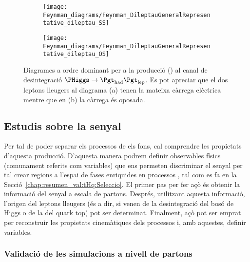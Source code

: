  
 
 \begin{figure}[htbp!]
  \centering  
  \begin{subfigure}[b]{0.45\textwidth}
    \centering
    \texttt{[image: Feynman\_diagrams/Feynman\_DileptauGeneralRepresentative\_dileptau\_SS]}
    \caption{\dilepSStau}
    \label{fig:tHq:Resum:diltauFeynmanDiagram:SS}
  \end{subfigure}
  \hfill
  \begin{subfigure}[b]{0.45\textwidth}
    \centering
    \texttt{[image: Feynman\_diagrams/Feynman\_DileptauGeneralRepresentative\_dileptau\_OS]}
    \caption{\dilepOStau}
    \label{fig:tHq:Resum:diltauFeynmanDiagram:OS}
  \end{subfigure}
  \caption{Diagrames a ordre dominant per a la producció \tHq (\dileptau) al canal de desintegració $\PHiggs \rightarrow \tauhad \taulep$.
Es pot apreciar que el dos leptons lleugers al diagrama (a) tenen la mateixa càrrega elèctrica mentre que en (b) la càrrega és oposada.}
  \label{fig:resum:ChaptH:dileptauFeynmanDiagram}
\end{figure}



\subsection{Estudis sobre la senyal}
\label{chap:resumen_val:tHq:Senyal}
Per tal de poder separar els processos \tHq de els fons, cal comprendre les propietats
d'aquesta producció. D'aquesta manera podrem definir observables físics (comunament referits com variables)
que ens permeten discriminar el senyal per tal crear regions a l'espai de fases enriquides en processos \tHq,
tal com es fa en la Secció~\ref{chap:resumen_val:tHq:Seleccio}. El primer pas per fer açò és obtenir la informació del senyal a escala de partons. Després, utilitzant aquesta informació, l'origen del leptons lleugers (és a dir, si venen
de la desintegració del bosó de Higgs o de la del quark top) pot ser determinat. Finalment, açò pot ser emprat per
reconstruir les propietats cinemàtiques dels processos \tHq i, amb aquestes, definir variables.


\subsubsection{Validació de les simulacions a nivell de partons}
\label{chap:resumen_val:tHq:Senyal:truth}


